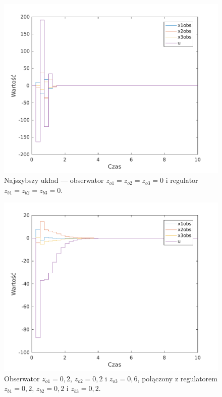 \begin{figure}[H]
\centering
 \includegraphics[width=\textwidth]{img/obsreg5.pdf}
\caption{Najszybszy układ --- obserwator $z_{o1}=z_{o2}=z_{o3}=0$ i regulator $z_{b1} = z_{b2} = z_{b3} = 0$.}
\end{figure}

\begin{figure}[H]
\centering
 \includegraphics[width=\textwidth]{img/obsreg6.pdf}
\caption{Obserwator $z_{o1}=0,2$, $z_{o2}=0,2$ i $z_{o3}=0,6$, połączony z regulatorem $z_{b1}=0,2$, $z_{b2}=0,2$ i $z_{b3}=0,2$.}
\end{figure}

